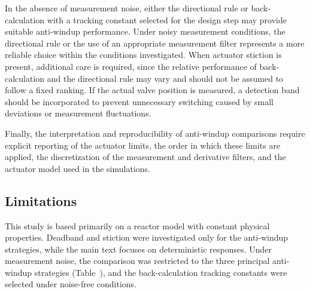 In the absence of measurement noise, either the directional rule or back-calculation with a tracking constant selected for the design step may provide suitable anti-windup performance. Under noisy measurement conditions, the directional rule or the use of an appropriate measurement filter represents a more reliable choice within the conditions investigated. When actuator stiction is present, additional care is required, since the relative performance of back-calculation and the directional rule may vary and should not be assumed to follow a fixed ranking. If the actual valve position is measured, a detection band should be incorporated to prevent unnecessary switching caused by small deviations or measurement fluctuations.

Finally, the interpretation and reproducibility of anti-windup comparisons require explicit reporting of the actuator limits, the order in which these limits are applied, the discretization of the measurement and derivative filters, and the actuator model used in the simulations.



\subsection{Limitations}
\label{subsec:limitations}
This study is based primarily on a reactor model with constant physical properties. Deadband and stiction were investigated only for the anti-windup strategies, while the main text focuses on deterministic responses. Under measurement noise, the comparison was restricted to the three principal anti-windup strategies (Table~), and the back-calculation tracking constants were selected under noise-free conditions.

